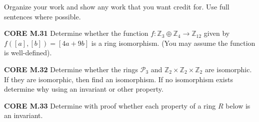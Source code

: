 \documentclass[addpoints]{exam}
\begin{document}
Organize your work and show any work that you want credit for. Use full sentences where possible.

\begin{questions}

\question \textbf{CORE M.31}
Determine whether the function $f\colon\mathbb{Z}_{3}\oplus\mathbb{Z}_4\to\mathbb{Z}_{12}$ given by $f([a],[b])=[4a+9b]$ is a ring isomorphism. (You may assume the function is well-defined).

\question \textbf{CORE M.32}
Determine whether the rings $\mathcal{P}_3$ and $\mathbb{Z}_2\times\mathbb{Z}_2\times\mathbb{Z}_2$ are isomorphic. If they are isomorphic, then find an isomorphism. If no isomorphism exists determine why using an invariant or other property.

\question \textbf{CORE M.33}
Determine with proof whether each  property of a ring $R$ below is an invariant.


\end{questions}
\end{document}

